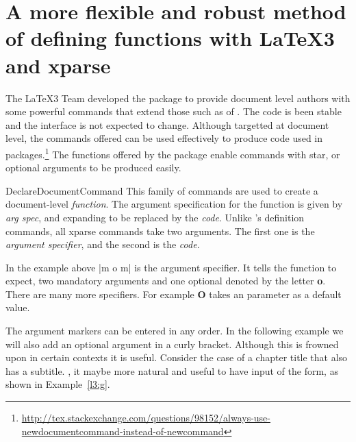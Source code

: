 \chapter{A more flexible and robust method of defining functions with LaTeX3 and xparse}
\label{ch:xparse}

The \LaTeX3 Team developed the package  to provide document level 
authors with some powerful commands that extend those such as 
of \latexe. The code is been stable and the interface is not expected to change. 
Although targetted at document level, the commands offered can be used effectively to produce code used in packages.\footnote{\protect\url{http://tex.stackexchange.com/questions/98152/always-use-newdocumentcommand-instead-of-newcommand}} The functions offered by the package enable commands with star, or optional arguments to be produced easily. 

\begin{docCommand}{DeclareDocumentCommand}{}
This family of commands are used to create a document-level \emph{function}. The argument
specification for the function is given by \textit{arg spec}, and expanding to be replaced by the
\textit{code}. Unlike \latex's definition commands, all xparse commands take two arguments.
The first one is the \textit{argument specifier}, and the second is the \textit{code.}
\end{docCommand}


In the example above |{m o m}| is the argument specifier. It tells the function  to expect, two mandatory arguments and one optional denoted by the letter \textbf{o}. There are many more specifiers. For example \textbf{O} takes an parameter as a default value.


The argument markers can be entered in any order. In the following example we will also add an optional argument in a curly bracket. Although this is frowned upon in certain contexts it is useful. Consider the case of a chapter title that also has a subtitle. , it maybe more natural and useful to have input of the form, as shown in Example~\ref{l3:g}. 

